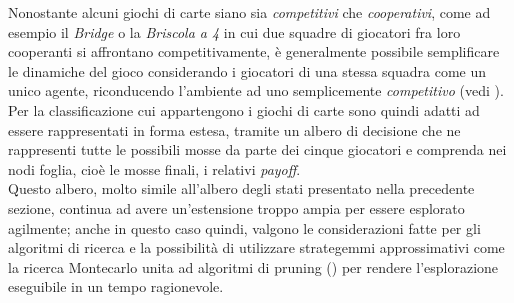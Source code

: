 Nonostante alcuni giochi di carte siano sia \emph{competitivi} che \emph{cooperativi}, come ad esempio il \emph{Bridge} o la \emph{Briscola a 4} in cui due squadre di giocatori fra loro cooperanti si affrontano competitivamente, è generalmente possibile semplificare le dinamiche del gioco considerando i giocatori di una stessa squadra come un unico agente, riconducendo l'ambiente ad uno semplicemente \emph{competitivo} (vedi \cite{pavel}).\\

Per la classificazione cui appartengono i giochi di carte sono quindi adatti ad essere rappresentati in forma estesa, tramite un albero di decisione che ne rappresenti tutte le possibili mosse da parte dei cinque giocatori e comprenda nei nodi foglia, cioè le mosse finali, i relativi \emph{payoff}.\\

Questo albero, molto simile all'albero degli stati presentato nella precedente sezione, continua ad avere un'estensione troppo ampia per essere esplorato agilmente; anche in questo caso quindi, valgono le considerazioni fatte per gli algoritmi di ricerca e la possibilità di utilizzare strategemmi approssimativi come la ricerca Montecarlo unita ad algoritmi di pruning (\cite{pavel}) per rendere l'esplorazione eseguibile in un tempo ragionevole.


